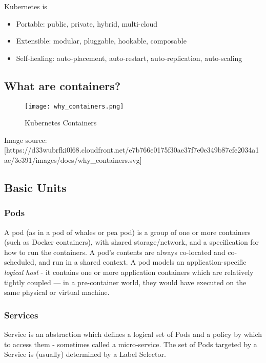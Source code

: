 Kubernetes is

\begin{itemize}

\item
  Portable: public, private, hybrid, multi-cloud
\item
  Extensible: modular, pluggable, hookable, composable
\item
  Self-healing: auto-placement, auto-restart, auto-replication,
  auto-scaling
\end{itemize}

\subsection{What are containers?}\label{what-are-containers}

\begin{figure}[htbp]
\centering
\texttt{[image: why\_containers.png]}
\caption{Kubernetes Containers}
\end{figure}

Image source:
{[}https://d33wubrfki0l68.cloudfront.net/e7b766e0175f30ae37f7e0e349b87cfe2034a1ae/3e391/images/docs/why\_containers.svg{]}

\subsection{Basic Units}\label{basic-units}

\subsubsection{Pods}\label{pods}

A pod (as in a pod of whales or pea pod) is a group of one or more
containers (such as Docker containers), with shared storage/network, and
a specification for how to run the containers. A pod's contents are
always co-located and co-scheduled, and run in a shared context. A pod
models an application-specific \textit{logical host} - it contains one or
more application containers which are relatively tightly coupled --- in
a pre-container world, they would have executed on the same physical or
virtual machine.

\subsubsection{Services}\label{services}

Service is an abstraction which defines a logical set of Pods and a
policy by which to access them - sometimes called a micro-service. The
set of Pods targeted by a Service is (usually) determined by a Label
Selector.


